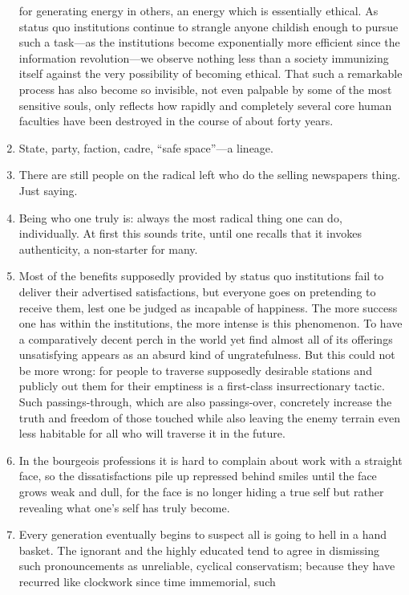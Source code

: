 \documentclass[a4paper,12pt,margin=.5in]{article}
\begin{document}
\begin{enumerate}
  for generating energy in others, an energy which is essentially
  ethical. As status quo institutions continue to strangle anyone
  childish enough to pursue such a task---as the institutions become
  exponentially more efficient since the information revolution---we
  observe nothing less than a society immunizing itself against the very
  possibility of becoming ethical. That such a remarkable process has
  also become so invisible, not even palpable by some of the most
  sensitive souls, only reflects how rapidly and completely several core
  human faculties have been destroyed in the course of about forty
  years.
\item
  State, party, faction, cadre, ``safe space''---a lineage.
\item
  There are still people on the radical left who do the selling
  newspapers thing. Just saying.
\item
  Being who one truly is: always the most radical thing one can do,
  individually. At first this sounds trite, until one recalls that it
  invokes authenticity, a non-starter for many.
\item
  Most of the benefits supposedly provided by status quo institutions
  fail to deliver their advertised satisfactions, but everyone goes on
  pretending to receive them, lest one be judged as incapable of
  happiness. The more success one has within the institutions, the more
  intense is this phenomenon. To have a comparatively decent perch in
  the world yet find almost all of its offerings unsatisfying appears as
  an absurd kind of ungratefulness. But this could not be more wrong:
  for people to traverse supposedly desirable stations and publicly out
  them for their emptiness is a first-class insurrectionary tactic. Such
  passings-through, which are also passings-over, concretely increase
  the truth and freedom of those touched while also leaving the enemy
  terrain even less habitable for all who will traverse it in the
  future.
\item
  In the bourgeois professions it is hard to complain about work with a
  straight face, so the dissatisfactions pile up repressed behind smiles
  until the face grows weak and dull, for the face is no longer hiding a
  true self but rather revealing what one's self has truly become.
\item
  Every generation eventually begins to suspect all is going to hell in
  a hand basket. The ignorant and the highly educated tend to agree in
  dismissing such pronouncements as unreliable, cyclical conservatism;
  because they have recurred like clockwork since time immemorial, such

\end{enumerate}
\end{document}
